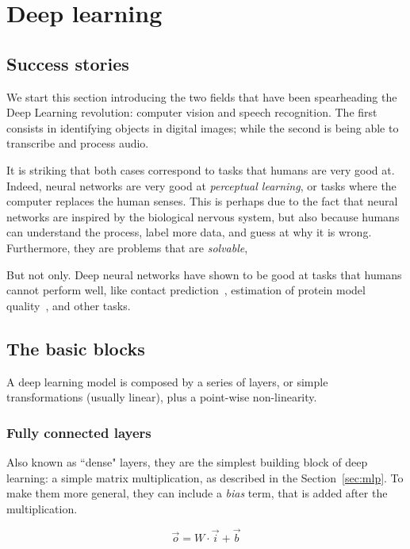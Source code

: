 \chapter{Deep learning}
\section{Success stories}
We start this section introducing the two fields that have been spearheading the Deep Learning revolution: computer vision and speech recognition.
The first consists in identifying objects in digital images; while the second is being able to transcribe and process audio.

It is striking that both cases correspond to tasks that humans are very good at.
Indeed, neural networks are very good at \emph{perceptual learning}, or tasks where the computer replaces the human senses.
This is perhaps due to the fact that neural networks are inspired by the biological nervous system, but also because humans can understand the process,
label more data, and guess at why it is wrong.
Furthermore, they are problems that are \emph{solvable},

But not only.
Deep neural networks have shown to be good at tasks that humans cannot perform well, like contact prediction~\citep{ultra_deep_contacts}, estimation of protein model quality~\citep{casp13_ema}, and other tasks.


\section{The basic blocks}
A deep learning model is composed by a series of layers, or simple transformations (usually linear), plus a point-wise non-linearity.


\subsection{Fully connected layers}
Also known as ``dense" layers, they are the simplest building block of deep learning: a simple matrix multiplication, as described in the Section~\ref{sec:mlp}.
To make them more general, they can include a \emph{bias} term, that is added after the multiplication.

\begin{equation*}
\vec{o} = W \cdot \vec{i} + \vec{b}
\end{equation*}

